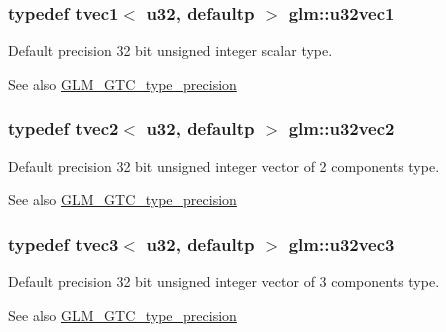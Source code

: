 \subsubsection[{u32vec1}]{\setlength{\rightskip}{0pt plus 5cm}typedef tvec1$<$ u32, defaultp $>$ {\bf glm\+::u32vec1}}\label{group__gtc__type__precision_ga09dd72852808c32ba398674736b9672a}
Default precision 32 bit unsigned integer scalar type. \begin{DoxySeeAlso}{See also}
\hyperlink{group__gtc__type__precision}{G\+L\+M\+\_\+\+G\+T\+C\+\_\+type\+\_\+precision} 
\end{DoxySeeAlso}
\hypertarget{group__gtc__type__precision_gad3a81c0d5a6941bb9ffdc9fa8611b426}{}
\subsubsection[{u32vec2}]{\setlength{\rightskip}{0pt plus 5cm}typedef tvec2$<$ u32, defaultp $>$ {\bf glm\+::u32vec2}}\label{group__gtc__type__precision_gad3a81c0d5a6941bb9ffdc9fa8611b426}
Default precision 32 bit unsigned integer vector of 2 components type. \begin{DoxySeeAlso}{See also}
\hyperlink{group__gtc__type__precision}{G\+L\+M\+\_\+\+G\+T\+C\+\_\+type\+\_\+precision} 
\end{DoxySeeAlso}
\hypertarget{group__gtc__type__precision_ga16b26751ba6b83c8a0226b9834d73fdc}{}
\subsubsection[{u32vec3}]{\setlength{\rightskip}{0pt plus 5cm}typedef tvec3$<$ u32, defaultp $>$ {\bf glm\+::u32vec3}}\label{group__gtc__type__precision_ga16b26751ba6b83c8a0226b9834d73fdc}
Default precision 32 bit unsigned integer vector of 3 components type. \begin{DoxySeeAlso}{See also}
\hyperlink{group__gtc__type__precision}{G\+L\+M\+\_\+\+G\+T\+C\+\_\+type\+\_\+precision} 
\end{DoxySeeAlso}
\hypertarget{group__gtc__type__precision_ga6e966cda0025699449a36b41f1787927}{}
